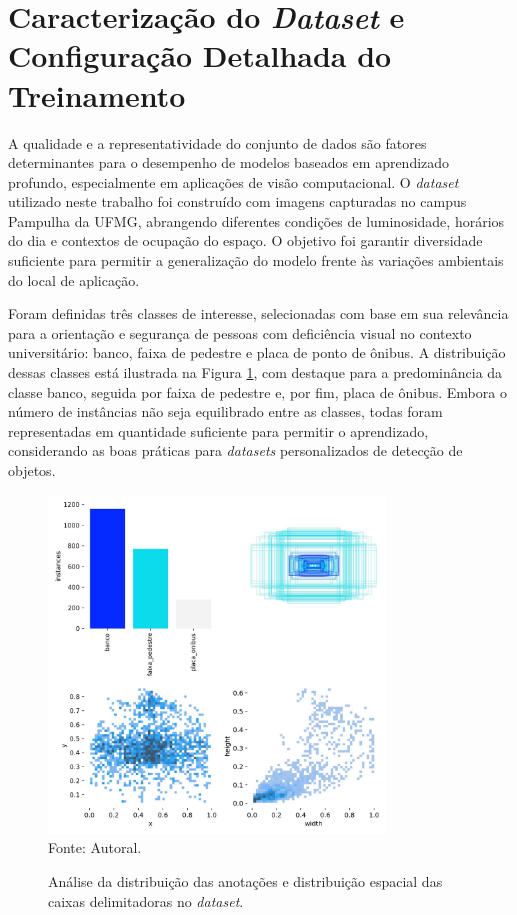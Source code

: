 \section{\textbf{Caracterização do \textit{Dataset} e Configuração Detalhada do Treinamento}}

A qualidade e a representatividade do conjunto de dados são fatores determinantes para o desempenho de modelos baseados em aprendizado profundo, especialmente em aplicações de visão computacional. O \textit{dataset} utilizado neste trabalho foi construído com imagens capturadas no campus Pampulha da UFMG, abrangendo diferentes condições de luminosidade, horários do dia e contextos de ocupação do espaço. O objetivo foi garantir diversidade suficiente para permitir a generalização do modelo frente às variações ambientais do local de aplicação.

Foram definidas três classes de interesse, selecionadas com base em sua relevância para a orientação e segurança de pessoas com deficiência visual no contexto universitário: banco, faixa de pedestre e placa de ponto de ônibus. A distribuição dessas classes está ilustrada na Figura \ref{fg-labels}, com destaque para a predominância da classe banco, seguida por faixa de pedestre e, por fim, placa de ônibus. Embora o número de instâncias não seja equilibrado entre as classes, todas foram representadas em quantidade suficiente para permitir o aprendizado, considerando as boas práticas para \textit{datasets} personalizados de detecção de objetos.

\begin{figure}[htbp]
  \centering
  \caption{Análise da distribuição das anotações e distribuição espacial das caixas delimitadoras no \textit{dataset}.}
  \includegraphics[width=0.8\textwidth]{Figuras/labels.jpg}
  \\
  Fonte: Autoral.
  \label{fg-labels}
\end{figure}

